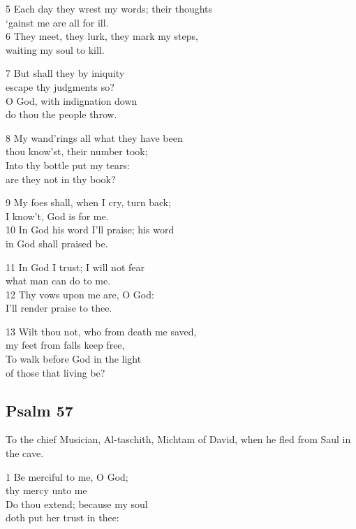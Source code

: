 \begin{multicols}{3}
5 Each day they wrest my words; their thoughts\\
‘gainst me are all for ill.\\
6 They meet, they lurk, they mark my steps,\\
waiting my soul to kill.

7 But shall they by iniquity\\
escape thy judgments so?\\
O God, with indignation down\\
do thou the people throw.

8 My wand’rings all what they have been\\
thou know’st, their number took;\\
Into thy bottle put my tears:\\
are they not in thy book?

9 My foes shall, when I cry, turn back;\\
I know’t, God is for me.\\
10 In God his word I’ll praise; his word\\
in God shall praised be.

11 In God I trust; I will not fear\\
what man can do to me.\\
12 Thy vows upon me are, O God:\\
I’ll render praise to thee.

13 Wilt thou not, who from death me saved,\\
my feet from falls keep free,\\
To walk before God in the light\\
of those that living be?

\begin{center}
\quad{}\quad{}
\end{center}

\subsection*{Psalm 57}

To the chief Musician, Al-taschith, Michtam
of David, when he fled from Saul in the cave.

1 Be merciful to me, O God;\\
thy mercy unto me\\
Do thou extend; because my soul\\
doth put her trust in thee:


\end{multicols}
